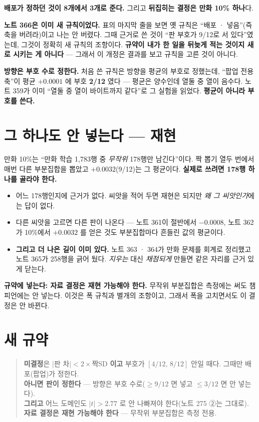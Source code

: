 \documentclass[11pt]{article}
\begin{document}
\textbf{배포가 정하던 것이 8개에서 3개로 준다.} 그리고 \textbf{뒤집히는
결정은 만화 10\% 하나}다.

\textbf{노트 366은 이미 새 규칙이었다.} 표의 마지막 줄을 보면 옛 규칙은
``배포 · 넣음''(즉 축을 버려라)이고 나는 안 버렸다. 그때 근거로 쓴 것이
``판 부호가 9/12로 서 있다''였는데, 그것이 정확히 새 규칙의 조항이다.
\textbf{규약이 내가 한 일을 뒤늦게 적는 것이지 새로 시키는 게 아니다} ---
그래서 이 개정은 결과를 보고 규칙을 고른 것이 아니다.

\textbf{방향은 부호 수로 정한다.} 처음 쓴 규칙은 방향을 평균의 부호로
정했는데, ``팝업 전용 축''이 평균 $+0.0001$ 에 부호 \textbf{2/12} 였다 ---
평균은 양수인데 열둘 중 열이 음수다. 노트 359가 이미 ``열둘 중 열이
바이트까지 같다''로 그 실험을 읽었다. \textbf{평균이 아니라 부호를 쓴다.}

\section{그 하나도 안 넣는다 --- 재현}

만화 10\%는 ``만화 학습 1,783행 중 \emph{무작위} 178행만 남긴다''이다.
짝 뽑기 열두 번에서 매번 다른 부분집합을 뽑았고 $+0.0032$(9/12)는 그
평균이다. \textbf{실제로 쓰려면 178행 하나를 골라야 한다.}

\begin{itemize}
\item 어느 178행인지에 근거가 없다. 씨앗을 적어 두면 재현은 되지만
\emph{왜 그 씨앗인가}에는 답이 없다.
\item 다른 씨앗을 고르면 다른 판이 나온다 --- 노트 361이 절반에서
$-0.0008$, 노트 362가 10\%에서 $+0.0032$ 를 얻은 것도 부분집합마다
흔들린 값의 평균이다.
\item \textbf{그리고 더 나은 길이 이미 있다.} 노트 363 · 364가 만화 문제를
회계로 정리했고 노트 365가 258행을 긁어 뒀다. \emph{지우는} 대신
\emph{채점되게} 만들면 같은 자리를 근거 있게 닫는다.
\end{itemize}

\textbf{규약에 넣는다: 자료 결정은 재현 가능해야 한다.} 무작위 부분집합은
측정에는 써도 챔피언에는 안 넣는다. 이것은 폭 규칙과 별개의 조항이고,
그래서 폭을 고치면서도 이 결정은 안 바뀐다.

\section{새 규약}

\begin{quote}
\textbf{미결정}은 $|$판 차$| < 2\times$짝SD \textbf{이고} 부호가
$[4/12,\,8/12]$ 안일 때다. 그때만 배포(팝업)가 정한다. \\
\textbf{아니면 판이 정한다} --- 방향은 부호 수로($\ge 9/12$ 면 넣고
$\le 3/12$ 면 안 넣는다). \\
\textbf{그리고} 어느 도메인도 $|t|>2.77$ 로 안 나빠져야 한다(노트 275 ②는
그대로). \\
\textbf{자료 결정은 재현 가능해야 한다} --- 무작위 부분집합은 측정 전용.
\end{quote}
\end{document}
